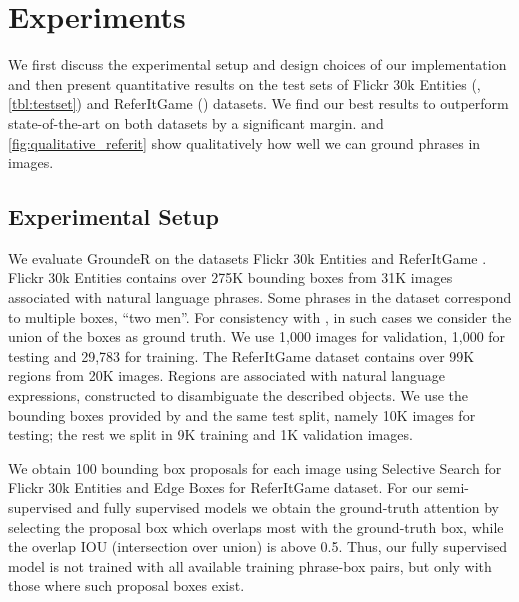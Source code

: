 \section{Experiments}
\label{sec:results}

We first discuss the experimental setup and design choices of our implementation and then present  quantitative results on the test sets of Flickr 30k Entities (,\ref{tbl:testset}) and ReferItGame () datasets. We find our best results to outperform state-of-the-art on both datasets by a significant margin.  and \ref{fig:qualitative_referit} show qualitatively how well we can ground phrases in images.

\subsection{Experimental Setup}
\label{sec:expsetup}

We evaluate GroundeR on the datasets Flickr 30k Entities \cite{plummer15iccv} and ReferItGame \cite{kazemzadeh14emnlp}. Flickr 30k Entities \cite{plummer15iccv} contains over 275K bounding boxes from 31K images associated with natural language phrases. Some phrases in the dataset correspond to multiple boxes, \eg ``two men''. For consistency with \cite{plummer15iccv}, in such cases we consider the union of the boxes as ground truth. We use 1,000 images for validation, 1,000 for testing and 29,783 for training. 
The ReferItGame \cite{kazemzadeh14emnlp} dataset contains over 99K regions from 20K images. Regions are associated with natural language expressions, constructed to disambiguate the described objects. We use the bounding boxes provided by \cite{hu16cvpr} and the same test split, namely 10K images for testing; the rest we split in 9K training and 1K validation images.



We obtain 100 bounding box proposals for each image using Selective Search \cite{uijlings2013selective} for Flickr 30k Entities and Edge Boxes \cite{zitnick2014eccv} for ReferItGame dataset. For our semi-supervised and fully supervised models we obtain the ground-truth attention by selecting the proposal box which overlaps most with the ground-truth box, while the overlap IOU (intersection over union) is above 0.5. Thus, our fully supervised model is not trained with all available training phrase-box pairs, but only with those where such proposal boxes exist.

